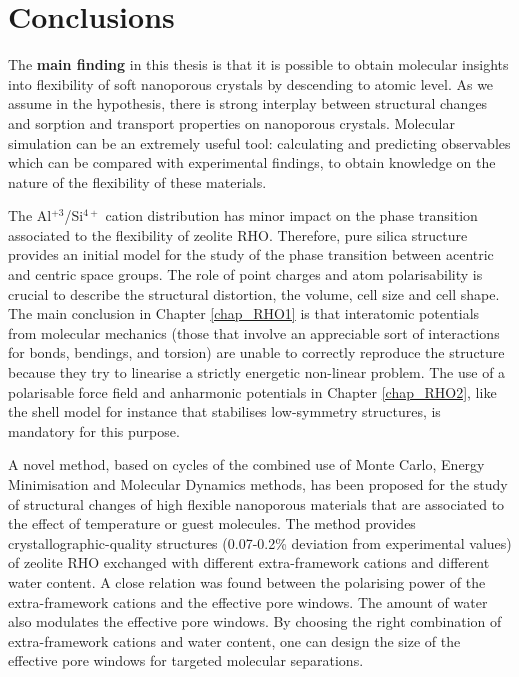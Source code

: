 %
\cleardoublepage
{}
{}
\setcounter{footnote}{0}
\chapter*{\textbf{Conclusions}}
The \textbf{main finding} in this thesis is that it is possible to obtain molecular insights into flexibility of soft nanoporous crystals by descending to atomic level. As we assume in the hypothesis, there is strong interplay between structural changes and sorption and transport properties on nanoporous crystals. Molecular simulation can be an extremely useful tool: calculating and predicting observables which can be compared with experimental findings, to obtain knowledge on the nature of the flexibility of these materials.

The Al$^{+3}$/Si$^{4+}$ cation distribution has minor impact on the phase transition associated to the flexibility of zeolite RHO. Therefore, pure silica structure provides an initial model for the study of the phase transition between acentric and centric space groups. The role of point charges and atom polarisability is crucial to describe the structural distortion, the volume, cell size and cell shape. The main conclusion in Chapter \ref{chap_RHO1} is that interatomic potentials from molecular mechanics (those that involve an appreciable sort of interactions for bonds, bendings, and torsion) are unable to correctly reproduce the structure because they try to linearise a strictly energetic non-linear problem. The use of a polarisable force field and anharmonic potentials in Chapter \ref{chap_RHO2}, like the shell model for instance that stabilises low-symmetry structures, is mandatory for this purpose.

A novel method, based on cycles of the combined use of Monte Carlo, Energy Minimisation and Molecular Dynamics methods, has been proposed for the study of structural changes of high flexible nanoporous materials that are associated to the effect of temperature or guest molecules. The method provides crystallographic-quality structures (0.07-0.2\% deviation from experimental values) of zeolite RHO exchanged with different extra-framework cations and different water content. A close relation was found between the polarising power of the extra-framework cations and the effective pore windows. The amount of water also modulates the effective pore windows. By choosing the right combination of extra-framework cations and water content, one can design the size of the effective pore windows for  targeted molecular separations.

